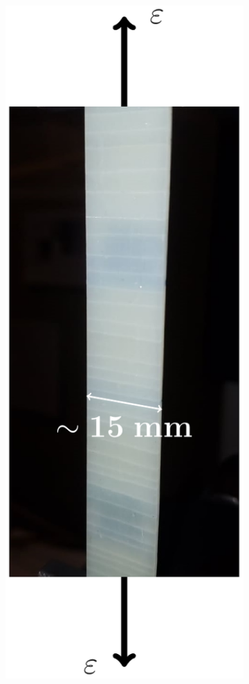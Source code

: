 \begin{figure}[!h]
\centering
    \begin{subfigure}[c]{0.3\textwidth}
    \centering
        \includegraphics[height=0.75\textheight]{pics/transversecracks-macro.pdf}

\end{subfigure}
\end{figure}
